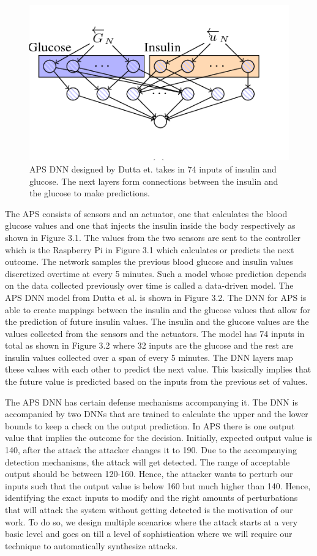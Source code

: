 \begin{figure}
	\centering
	\includegraphics[width=0.7\linewidth, height=0.3\linewidth]{Images/APSDNN}
	\caption[APS DNN]{APS DNN designed by Dutta et. takes in 74 inputs of insulin and glucose. The next layers form connections between the insulin and the glucose to make predictions.}
	\label{fig:apsdnn}
\end{figure}

The APS consists of sensors and an actuator, one that calculates the blood glucose values and one that injects the insulin inside the body respectively as shown in Figure 3.1. The values from the two sensors are sent to the controller which is the Raspberry Pi in Figure 3.1 which calculates or predicts the next outcome. The network samples the previous blood glucose and insulin values discretized overtime at every 5 minutes. Such a model whose prediction depends on the data collected previously over time is called a data-driven model. The APS DNN model from Dutta et al. is shown in Figure 3.2. The DNN for APS is able to create mappings between the insulin and the glucose values that allow for the prediction of future insulin values. The insulin and the glucose values are the values collected from the sensors and the actuators. The model has 74 inputs in total as shown in Figure 3.2 where 32 inputs are the glucose and the rest are insulin values collected over a span of every 5 minutes. The DNN layers map these values with each other to predict the next value. This basically implies that the future value is predicted based on the inputs from the previous set of values. 


The APS DNN has certain defense mechanisms accompanying it. The DNN is accompanied by two DNNs that are trained to calculate the upper and the lower bounds to keep a check on the output prediction. In APS there is one output value that implies the outcome for the decision. Initially, expected output value is 140, after the attack the attacker changes it to 190. Due to the accompanying detection mechanisms, the attack will get detected. The range of acceptable output should be between 120-160. Hence, the attacker wants to perturb our inputs such that the output value is below 160 but much higher than 140. Hence, identifying the exact inputs to modify and the right amounts of perturbations that will attack the system without getting detected is the motivation of our work. To do so, we design multiple scenarios where the attack starts at a very basic level and goes on till a level of sophistication where we will require our technique to automatically synthesize attacks. 

